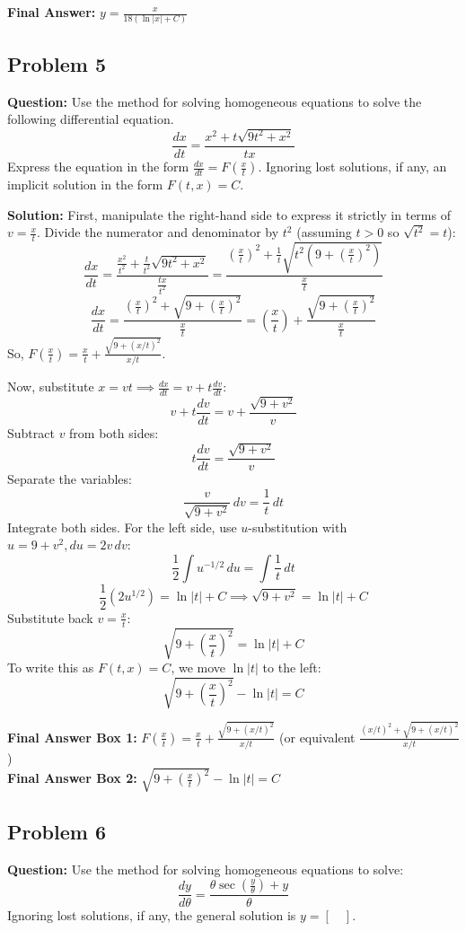\documentclass[11pt]{article}
\begin{document}
\textbf{Final Answer:} $y = \frac{x}{18(\ln|x| + C)}$

\vspace{0.5cm}
\subsection*{Problem 5}
\textbf{Question:} Use the method for solving homogeneous equations to solve the following differential equation.
\[ \frac{dx}{dt} = \frac{x^2 + t\sqrt{9t^2 + x^2}}{tx} \]
Express the equation in the form $\frac{dx}{dt} = F\left(\frac{x}{t}\right)$.
Ignoring lost solutions, if any, an implicit solution in the form $F(t,x) = C$.

\textbf{Solution:}
First, manipulate the right-hand side to express it strictly in terms of $v = \frac{x}{t}$. Divide the numerator and denominator by $t^2$ (assuming $t > 0$ so $\sqrt{t^2} = t$):
\[ \frac{dx}{dt} = \frac{\frac{x^2}{t^2} + \frac{t}{t^2}\sqrt{9t^2 + x^2}}{\frac{tx}{t^2}} = \frac{\left(\frac{x}{t}\right)^2 + \frac{1}{t}\sqrt{t^2\left(9 + \left(\frac{x}{t}\right)^2\right)}}{\frac{x}{t}} \]
\[ \frac{dx}{dt} = \frac{\left(\frac{x}{t}\right)^2 + \sqrt{9 + \left(\frac{x}{t}\right)^2}}{\frac{x}{t}} = \left(\frac{x}{t}\right) + \frac{\sqrt{9 + \left(\frac{x}{t}\right)^2}}{\frac{x}{t}} \]
So, $F\left(\frac{x}{t}\right) = \frac{x}{t} + \frac{\sqrt{9 + (x/t)^2}}{x/t}$.

Now, substitute $x = vt \implies \frac{dx}{dt} = v + t\frac{dv}{dt}$:
\[ v + t\frac{dv}{dt} = v + \frac{\sqrt{9 + v^2}}{v} \]
Subtract $v$ from both sides:
\[ t\frac{dv}{dt} = \frac{\sqrt{9 + v^2}}{v} \]
Separate the variables:
\[ \frac{v}{\sqrt{9 + v^2}} \, dv = \frac{1}{t} \, dt \]
Integrate both sides. For the left side, use $u$-substitution with $u = 9 + v^2, du = 2v \, dv$:
\[ \frac{1}{2} \int u^{-1/2} \, du = \int \frac{1}{t} \, dt \]
\[ \frac{1}{2} \left(2u^{1/2}\right) = \ln|t| + C \implies \sqrt{9 + v^2} = \ln|t| + C \]
Substitute back $v = \frac{x}{t}$:
\[ \sqrt{9 + \left(\frac{x}{t}\right)^2} = \ln|t| + C \]
To write this as $F(t,x) = C$, we move $\ln|t|$ to the left:
\[ \sqrt{9 + \left(\frac{x}{t}\right)^2} - \ln|t| = C \]

\textbf{Final Answer Box 1:} $F\left(\frac{x}{t}\right) = \frac{x}{t} + \frac{\sqrt{9 + (x/t)^2}}{x/t}$ (or equivalent $\frac{(x/t)^2 + \sqrt{9+(x/t)^2}}{x/t}$) \\
\textbf{Final Answer Box 2:} $\sqrt{9 + \left(\frac{x}{t}\right)^2} - \ln|t| = C$

\vspace{0.5cm}
\subsection*{Problem 6}
\textbf{Question:} Use the method for solving homogeneous equations to solve:
\[ \frac{dy}{d\theta} = \frac{\theta \sec\left(\frac{y}{\theta}\right) + y}{\theta} \]
Ignoring lost solutions, if any, the general solution is $y = [\quad]$.
\end{document}
